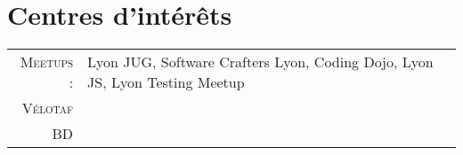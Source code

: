 %
%
%

\section{\texorpdfstring{\color{Blue}Centres d'intérêts}{Centres d'intérêts}}
\begin{tabular}{rl}
    \textsc{Meetups :} & Lyon JUG, Software Crafters Lyon, Coding Dojo, Lyon JS, Lyon Testing Meetup \\
    \textsc{Vélotaf} & \\
    \textsc{BD} & \\
\end{tabular}
